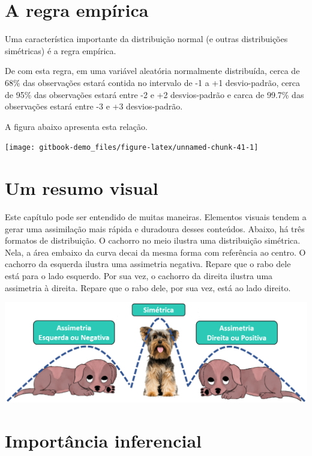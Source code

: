 \documentclass[
]{book}
\begin{document}
\hypertarget{a-regra-empuxedrica}{%
\section{A regra empírica}\label{a-regra-empuxedrica}}

Uma característica importante da distribuição normal (e outras
distribuições simétricas) é a regra empírica.

De com esta regra, em uma variável aleatória normalmente distribuída,
cerca de 68\% das observações estará contida no intervalo de -1 a +1
desvio-padrão, cerca de 95\% das observações estará entre -2 e +2
desvios-padrão e carca de 99.7\% das observações estará entre -3 e +3
desvios-padrão.

A figura abaixo apresenta esta relação.

\begin{center}\texttt{[image: gitbook-demo\_files/figure-latex/unnamed-chunk-41-1]} \end{center}

\hypertarget{um-resumo-visual}{%
\section{Um resumo visual}\label{um-resumo-visual}}

Este capítulo pode ser entendido de muitas maneiras. Elementos visuais
tendem a gerar uma assimilação mais rápida e duradoura desses conteúdos.
Abaixo, há três formatos de distribuição. O cachorro no meio ilustra uma
distribuição simétrica. Nela, a área embaixo da curva decai da mesma
forma com referência ao centro. O cachorro da esquerda ilustra uma
assimetria negativa. Repare que o rabo dele está para o lado esquerdo.
Por sua vez, o cachorro da direita ilustra uma assimetria à direita.
Repare que o rabo dele, por sua vez, está ao lado direito.

\includegraphics{./img/cap_desc_assimetria.png}

\hypertarget{importuxe2ncia-inferencial}{%
\section{Importância inferencial}\label{importuxe2ncia-inferencial}}
\end{document}
